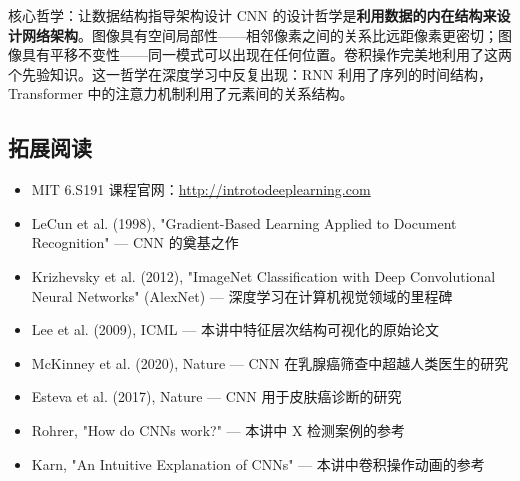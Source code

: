 \begin{importantbox}{核心哲学：让数据结构指导架构设计}
CNN 的设计哲学是\textbf{利用数据的内在结构来设计网络架构}。图像具有空间局部性——相邻像素之间的关系比远距像素更密切；图像具有平移不变性——同一模式可以出现在任何位置。卷积操作完美地利用了这两个先验知识。这一哲学在深度学习中反复出现：RNN 利用了序列的时间结构，Transformer 中的注意力机制利用了元素间的关系结构。
\end{importantbox}

\subsection{拓展阅读}

\begin{itemize}
    \item MIT 6.S191 课程官网：\url{http://introtodeeplearning.com}
    \item LeCun et al. (1998), "Gradient-Based Learning Applied to Document Recognition" — CNN 的奠基之作
    \item Krizhevsky et al. (2012), "ImageNet Classification with Deep Convolutional Neural Networks" (AlexNet) — 深度学习在计算机视觉领域的里程碑
    \item Lee et al. (2009), ICML — 本讲中特征层次结构可视化的原始论文
    \item McKinney et al. (2020), Nature — CNN 在乳腺癌筛查中超越人类医生的研究
    \item Esteva et al. (2017), Nature — CNN 用于皮肤癌诊断的研究
    \item Rohrer, "How do CNNs work?" — 本讲中 X 检测案例的参考
    \item Karn, "An Intuitive Explanation of CNNs" — 本讲中卷积操作动画的参考
\end{itemize}



